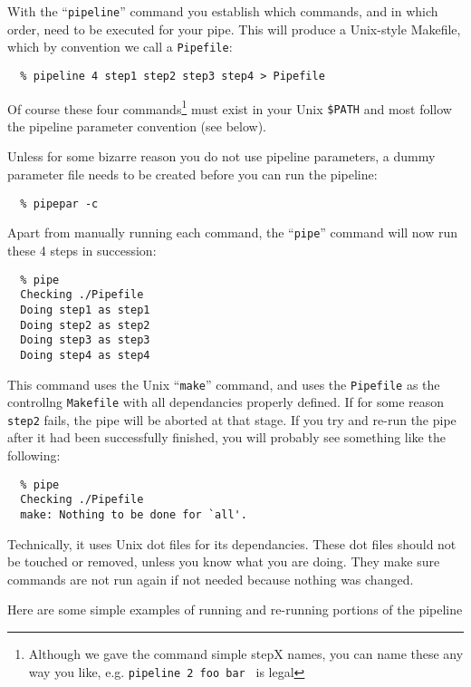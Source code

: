 \documentclass[preprint]{aastex} %
\begin{document}
With the ``{\tt pipeline}'' command you establish which commands,
and in which order, need to be executed for your pipe. This will
produce a Unix-style Makefile, which by convention we call a
{\tt Pipefile}:

\footnotesize
\begin{verbatim}
  % pipeline 4 step1 step2 step3 step4 > Pipefile
\end{verbatim}
\normalsize   

Of course these four commands\footnote{Although we gave
the command simple stepX names, you can name these any
way you like, e.g. {\tt pipeline 2 foo bar } is legal}
must exist in your Unix {\tt \$PATH} and
most follow the pipeline parameter convention (see below).

Unless for some bizarre reason you do not use pipeline
parameters, a dummy parameter file needs to be created
before you can run the pipeline:

\footnotesize
\begin{verbatim}
  % pipepar -c
\end{verbatim}
\normalsize   

Apart from manually running each command, the ``{\tt pipe}'' 
command will now run these 4 steps in succession:

\footnotesize
\begin{verbatim}
  % pipe
  Checking ./Pipefile
  Doing step1 as step1
  Doing step2 as step2
  Doing step3 as step3
  Doing step4 as step4
\end{verbatim}
\normalsize   

This command 
uses the Unix ``{\tt make}'' command, and uses the {\tt Pipefile}
as the controllng {\tt Makefile} with all dependancies properly defined.
If for some reason {\tt step2} fails, the pipe will be aborted at that stage. If
you try and re-run the pipe after it had been successfully
finished, you will probably see something like the following:

\footnotesize
\begin{verbatim}
  % pipe
  Checking ./Pipefile
  make: Nothing to be done for `all'.
\end{verbatim}
\normalsize   

Technically, it uses Unix dot files for its dependancies.
These dot files should not be touched or removed, unless you know what you are
doing. They make sure commands are not run again if not needed because
nothing was changed.

Here are some simple examples of running and re-running portions
of the pipeline
\end{document}
